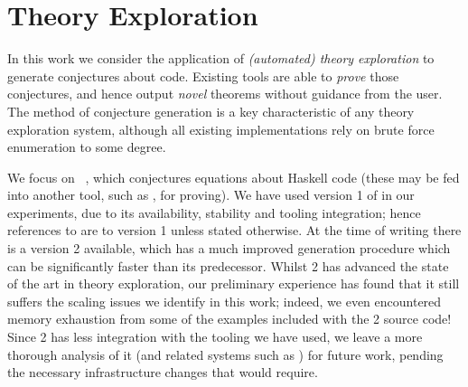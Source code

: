 \section{Theory Exploration}
\label{sec:theoryexploration}

\iffalse
Theory exploration is the task of taking a \emph{signature} of definitions in
some formal system (for example a programming language) and automatically
generating a set of formal statements (properties) involving those
definitions. These may be conjectures or theorems (proven either by sending
conjectures to an automated theorem prover, or by having the generating
procedure proceed in logically sound steps); in either case, these statements
must also be ``interesting'' in some way. It is beyond the scope of this paper
to define what makes a mathematical statement ``interesting'', but this problem
has been tackled extensively in the literature~\cite{colton2000notion}.
\fi

In this work we consider the application of \emph{(automated) theory
  exploration} to generate conjectures about code. Existing tools are able to
\emph{prove} those conjectures, and hence output \emph{novel} theorems without
guidance from the user. The method of conjecture generation is a key
characteristic of any theory exploration system, although all existing
implementations rely on brute force enumeration to some degree.

We focus on \qspec{}~\cite{QuickSpec}, which conjectures equations about Haskell
code (these may be fed into another tool, such as \hspec{}, for proving). We
have used version 1 of \qspec{} in our experiments, due to its availability,
stability and tooling integration; hence references to \qspec{} are to version 1
unless stated otherwise. At the time of writing there is a \qspec{} version 2
available, which has a much improved generation procedure which can be
significantly faster than its predecessor. Whilst \qspec{} 2 has advanced the
state of the art in theory exploration, our preliminary experience has found
that it still suffers the scaling issues we identify in this work; indeed, we
even encountered memory exhaustion from some of the examples included with the
\qspec{} 2 source code! Since \qspec{} 2 has less integration with the tooling
we have used, we leave a more thorough analysis of it (and related systems such
as \speculate{}) for future work, pending the necessary infrastructure changes
that would require.

